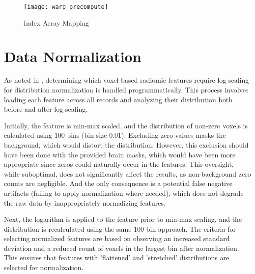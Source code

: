\begin{figure}[H]
\centering
\texttt{[image: warp\_precompute]}
\caption{Index Array Mapping}
\label{fig:warppre}
\end{figure}

\section{Data Normalization}
\label{app:imp-norm}

As noted in , determining which voxel-based radiomic features require log scaling for distribution normalization is handled programmatically. This process involves loading each feature across all records and analyzing their distribution both before and after log scaling.\par
Initially, the feature is min-max scaled, and the distribution of non-zero voxels is calculated using $100$ bins (bin size $0.01$). Excluding zero values masks the background, which would distort the distribution. However, this exclusion should have been done with the provided brain masks, which would have been more appropriate since zeros could naturally occur in the features. This oversight, while suboptimal, does not significantly affect the results, as non-background zero counts are negligible. And the only consequence is a potential false negative artifacts (failing to apply normalization where needed), which does not degrade the raw data by inappropriately normalizing features.\par
Next, the logarithm is applied to the feature prior to min-max scaling, and the distribution is recalculated using the same $100$ bin approach. The criteria for selecting normalized features are based on observing an increased standard deviation and a reduced count of voxels in the largest bin after normalization. This ensures that features with 'flattened' and 'stretched' distributions are selected for normalization.







